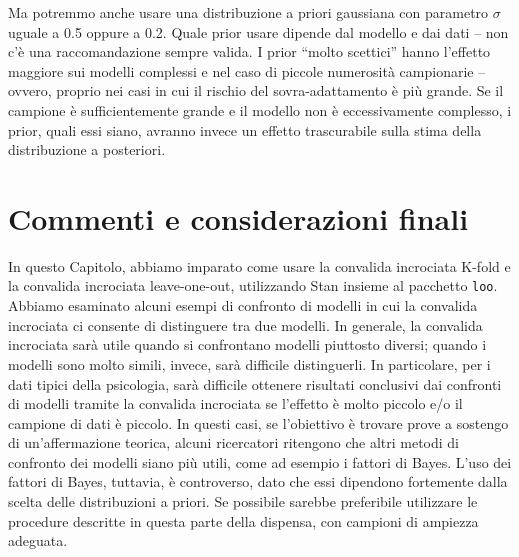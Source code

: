 \documentclass[
  11pt,
]{krantz}
\theoremstyle{definition}
\theoremstyle{definition}
\theoremstyle{definition}
\theoremstyle{definition}
\theoremstyle{remark}
\begin{document}
Ma potremmo anche usare una distribuzione a priori gaussiana con parametro \(\sigma\) uguale a 0.5 oppure a 0.2. Quale prior usare dipende dal modello e dai dati -- non c'è una raccomandazione sempre valida. I prior ``molto scettici'' hanno l'effetto maggiore sui modelli complessi e nel caso di piccole numerosità campionarie -- ovvero, proprio nei casi in cui il rischio del sovra-adattamento è più grande. Se il campione è sufficientemente grande e il modello non è eccessivamente complesso, i prior, quali essi siano, avranno invece un effetto trascurabile sulla stima della distribuzione a posteriori.

\hypertarget{commenti-e-considerazioni-finali-2}{%
\section*{Commenti e considerazioni finali}\label{commenti-e-considerazioni-finali-2}}


In questo Capitolo, abbiamo imparato come usare la convalida incrociata K-fold e la convalida incrociata leave-one-out, utilizzando Stan insieme al pacchetto \texttt{loo}. Abbiamo esaminato alcuni esempi di confronto di modelli in cui la convalida incrociata ci consente di distinguere tra due modelli. In generale, la convalida incrociata sarà utile quando si confrontano modelli piuttosto diversi; quando i modelli sono molto simili, invece, sarà difficile distinguerli. In particolare, per i dati tipici della psicologia, sarà difficile ottenere risultati conclusivi dai confronti di modelli tramite la convalida incrociata se l'effetto è molto piccolo e/o il campione di dati è piccolo. In questi casi, se l'obiettivo è trovare prove a sostengo di un'affermazione teorica, alcuni ricercatori ritengono che altri metodi di confronto dei modelli siano più utili, come ad esempio i fattori di Bayes. L'uso dei fattori di Bayes, tuttavia, è controverso, dato che essi dipendono fortemente dalla scelta delle distribuzioni a priori. Se possibile sarebbe preferibile utilizzare le procedure descritte in questa parte della dispensa, con campioni di ampiezza adeguata.

  

\printindex
\end{document}
